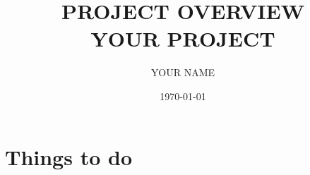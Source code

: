 \documentclass[a4paper]{article}
\title{PROJECT OVERVIEW\\YOUR PROJECT}
\date{\today}
\author{YOUR NAME}
\begin{document}


\tableofcontents
\listoffigures
\section{Things to do}
\cite{example:paper}


\end{document}
